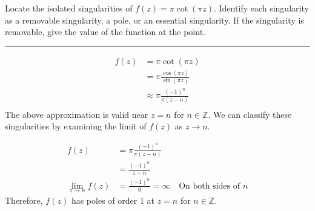 \begin{example}
    Locate the isolated singularities of \( f(z) = \pi \cot(\pi z) \). Identify each singularity as a removable singularity, a pole, or an essential singularity. If the singularity is removable, give the value of the function at the point.

    \hrule
    \vspace{0.5cm}

    \begin{align*}
        f(z) & = \pi \cot(\pi z)                     \\
             & = \pi \frac{\cos(\pi z)}{\sin(\pi z)} \\
             & \approx \pi \frac{(-1)^n}{\pi(z - n)} \\
    \end{align*}
    The above approximation is valid near $z = n$ for $n \in \mathbb{Z}$. We can classify these singularities by examining the limit of $f(z)$ as $z \to n$.

    \begin{align*}
        f(z)                & = \pi \frac{(-1)^n}{\pi(z - n)}                               \\
                            & = \frac{(-1)^n}{z - n}                                        \\
        \lim_{z \to n} f(z) & = \frac{(-1)^n}{0} = \infty \quad \text{On both sides of $n$}
    \end{align*}
    Therefore, $f(z)$ has poles of order 1 at $z = n$ for $n \in \mathbb{Z}$.
\end{example}

